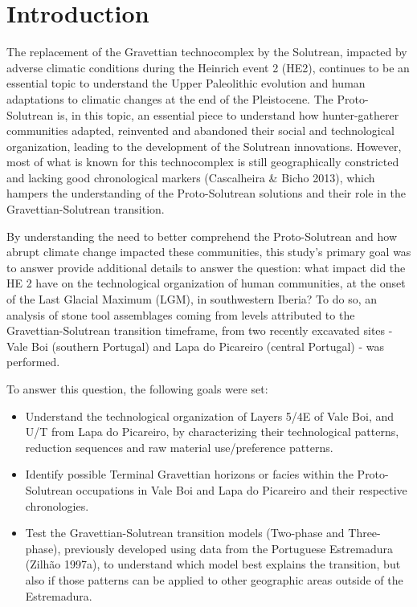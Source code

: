 \documentclass[12pt,twoside]{reedthesis}
\begin{document}
  \listoftables

  \listoffigures


\mainmatter %
\pagestyle{fancyplain} %

\hypertarget{introduction}{%
\chapter{Introduction}\label{introduction}}

The replacement of the Gravettian technocomplex by the Solutrean, impacted by adverse climatic conditions during the Heinrich event 2 (HE2), continues to be an essential topic to understand the Upper Paleolithic evolution and human adaptations to climatic changes at the end of the Pleistocene. The Proto-Solutrean is, in this topic, an essential piece to understand how hunter-gatherer communities adapted, reinvented and abandoned their social and technological organization, leading to the development of the Solutrean innovations. However, most of what is known for this technocomplex is still geographically constricted and lacking good chronological markers (Cascalheira \& Bicho 2013), which hampers the understanding of the Proto-Solutrean solutions and their role in the Gravettian-Solutrean transition.

By understanding the need to better comprehend the Proto-Solutrean and how abrupt climate change impacted these communities, this study's primary goal was to answer provide additional details to answer the question: what impact did the HE 2 have on the technological organization of human communities, at the onset of the Last Glacial Maximum (LGM), in southwestern Iberia? To do so, an analysis of stone tool assemblages coming from levels attributed to the Gravettian-Solutrean transition timeframe, from two recently excavated sites - Vale Boi (southern Portugal) and Lapa do Picareiro (central Portugal) - was performed.

To answer this question, the following goals were set:
\begin{itemize}
\item
  Understand the technological organization of Layers 5/4E of Vale Boi, and U/T from Lapa do Picareiro, by characterizing their technological patterns, reduction sequences and raw material use/preference patterns.
\item
  Identify possible Terminal Gravettian horizons or facies within the Proto-Solutrean occupations in Vale Boi and Lapa do Picareiro and their respective chronologies.
\item
  Test the Gravettian-Solutrean transition models (Two-phase and Three-phase), previously developed using data from the Portuguese Estremadura (Zilhão 1997a), to understand which model best explains the transition, but also if those patterns can be applied to other geographic areas outside of the Estremadura.
\end{itemize}
~
\end{document}

